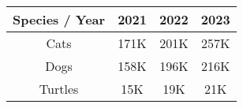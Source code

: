\documentclass{article}
\begin{document}
\begin{tabular}{|c|c|c|c|}
\hline
Species / Year & 2021 & 2022 & 2023 \\
\hline
Cats & 171K & 201K & 257K \\
\hline
Dogs & 158K & 196K & 216K \\
\hline
Turtles & 15K & 19K & 21K \\
\hline
\end{tabular}
\end{document}

